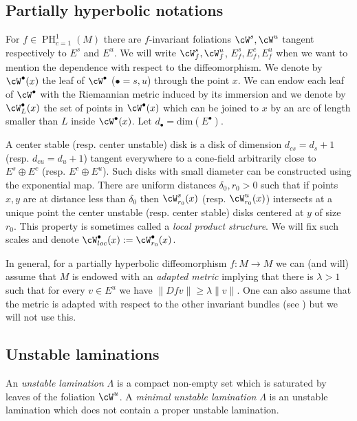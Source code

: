 \documentclass[a4paper,11pt]{amsart}
\numberwithin{equation}{section}     %
\theoremstyle{definition}
\theoremstyle{remark}
\DeclareMathOperator{\PH}{PH}
\begin{document}
\subsection{Partially hyperbolic notations}\label{ss.localproductstructure}

For $f \in \PH^1_{c=1}(M)$ there are $f$-invariant foliations $\cW^s, \cW^u$ tangent respectively to $E^s$ and $E^u$. We will write $\cW^s_f, \cW^u_f$, $E^s_f,E^c_f,E^u_f$ when we want to mention the dependence with respect to the diffeomorphism. We denote by $\cW^\bullet(x)$ the leaf of $\cW^\bullet$ ($\bullet=s,u$) through the point $x$. We can endow each leaf of $\cW^\bullet$ with the Riemannian metric  induced by its immersion and we denote by $\cW^\bullet_L(x)$ the set of points in $\cW^\bullet(x)$ which can be joined to $x$ by an arc of length smaller than $L$ inside $\cW^\bullet(x)$. Let $d_\bullet = \mathrm{dim}(E^\bullet)$. 

A center stable (resp. center unstable) disk is a disk of dimension $d_{cs}=d_s +1$ (resp. $d_{cu}=d_u+1$) tangent everywhere to a cone-field arbitrarily close to $E^s \oplus E^c$ (resp. $E^c \oplus E^u$).
Such disks with small diameter can be constructed using the exponential map. There are uniform distances $\delta_0,r_0>0$ such that if points $x,y$ are at distance less than $\delta_0$ then $\cW^s_{r_0}(x)$ (resp. $\cW^u_{r_0}(x)$) intersects at a unique point the center unstable (resp. center stable) disks centered at $y$ of size $r_0$. This property is sometimes called a \emph{local product structure}. We will fix such scales and denote $\cW^{\bullet}_{loc}(x):=\cW^{\bullet}_{r_0}(x)$. 

In general, for a partially hyperbolic diffeomorphism $f: M \to M$ we can (and will) assume that $M$ is endowed with an \emph{adapted metric} implying that there is $\lambda>1$ such that for every $v \in E^u$ we have $\|Df v \| \geq \lambda \|v\|$.
One can also assume that the metric is adapted with respect to the other invariant bundles (see \cite{CroPot}) but we will not use this. 

\subsection{Unstable laminations}\label{s.unstablelam}

An \emph{unstable lamination} $\Lambda$ is a compact non-empty set which is saturated by leaves of the foliation $\cW^u$. A \emph{minimal unstable lamination} $\Lambda$  is an unstable lamination which does not contain a proper unstable lamination.
\end{document}

